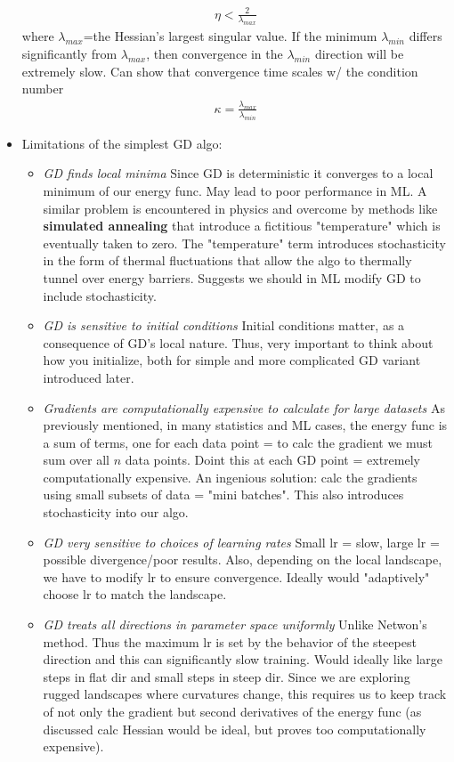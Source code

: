 \documentclass[norsk,a4paper,11pt]{article}
\begin{document}
\begin{itemize}
		\begin{align}
			\eta < \frac{2}{\lambda_{max}}
		\end{align}
		where $\lambda_{max}$=the Hessian's largest singular value. If the minimum $\lambda_{min}$ differs significantly from $\lambda_{max}$, then convergence in the $\lambda_{min}$ direction will be extremely slow. Can show that convergence time scales w/ the condition number
		\begin{align}
			\kappa = \frac{\lambda_{max}}{\lambda_{min}}
		\end{align}

		\item Limitations of the simplest GD algo:
		\begin{itemize}
			\item \textit{GD finds local minima}
			Since GD is deterministic it converges to a local minimum of our energy func. May lead to poor performance in ML. A similar problem is encountered in physics and overcome by methods like \textbf{simulated annealing} that introduce a fictitious "temperature" which is eventually taken to zero. The "temperature" term introduces stochasticity in the form of thermal fluctuations that allow the algo to thermally tunnel over energy barriers. Suggests we should in ML modify GD to include stochasticity. 
			\item \textit{GD is sensitive to initial conditions}
			Initial conditions matter, as a consequence of GD's local nature. Thus, very important to think about how you initialize, both for simple and more complicated GD variant introduced later.
			\item \textit{Gradients are computationally expensive to calculate for large datasets}
			As previously mentioned, in many statistics and ML cases, the energy func is a sum of terms, one for each data point = to calc the gradient we must sum over all $n$ data points. Doint this at each GD point = extremely computationally expensive. An ingenious solution: calc the gradients using small subsets of data = "mini batches". This also introduces stochasticity into our algo.
			\item \textit{GD very sensitive to choices of learning rates}
			Small lr = slow, large lr = possible divergence/poor results. Also, depending on the local landscape, we have to modify lr to ensure convergence. Ideally would "adaptively" choose lr to match the landscape.
			\item \textit{GD treats all directions in parameter space uniformly}
			Unlike Netwon's method. Thus the maximum lr is set by the behavior of the steepest direction and this can significantly slow training. Would ideally like large steps in flat dir and small steps in steep dir. Since we are exploring rugged landscapes where curvatures change, this requires us to keep track of not only the gradient but second derivatives of the energy func (as discussed calc Hessian would be ideal, but proves too computationally expensive).

\end{itemize}
\end{itemize}
\end{document}
